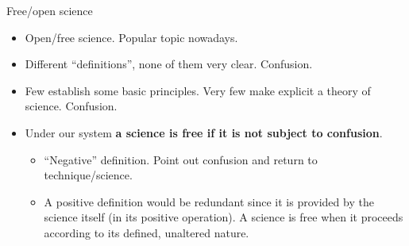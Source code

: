 \documentclass{beamer}
\begin{document}
\begin{frame}{Free/open science}

\begin{itemize}
\item Open/free science. Popular topic nowadays.
\item Different ``definitions'', none of them very clear. Confusion.
\item Few establish some basic principles. Very few make explicit a theory of science. Confusion.
\item Under our system \textbf{a science is free if it is not subject to confusion}.
	\begin{itemize}
	\item ``Negative'' definition. Point out confusion and return to technique/science.
	\item A positive definition would be redundant since it is provided by the science itself (in its positive operation). A science is free when it proceeds according to its defined, unaltered nature.
	\end{itemize}
\end{itemize}
\end{frame}
\end{document}
